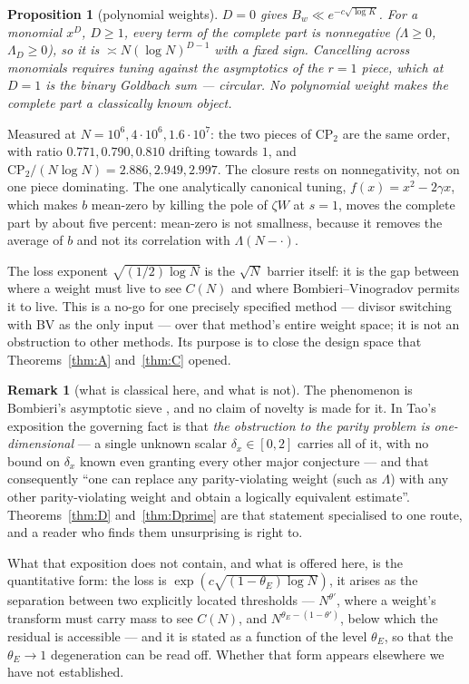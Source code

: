 \documentclass[11pt,a4paper]{article}
\theoremstyle{plain}
\newtheorem{proposition}[theorem]{Proposition}
\theoremstyle{definition}
\newtheorem{remark}[theorem]{Remark}
\begin{document}
\begin{proposition}[polynomial weights]\label{prop:Dpp}
$D=0$ gives $B_w\ll e^{-c\sqrt{\log K}}$. For a monomial $x^D$,
$D\ge1$, every term of the complete part is nonnegative
($\Lambda\ge0$, $\Lambda_D\ge0$), so it is $\asymp N(\log N)^{D-1}$
with a fixed sign. Cancelling across monomials requires tuning against
the asymptotics of the $r=1$ piece, which at $D=1$ is the binary
Goldbach sum --- circular. No polynomial weight makes the complete
part a classically known object.
\end{proposition}

Measured at $N=10^6,4\cdot10^6,1.6\cdot10^7$: the two pieces of
$\mathrm{CP}_2$ are the same order, with ratio $0.771,0.790,0.810$
drifting towards $1$, and $\mathrm{CP}_2/(N\log N) = 2.886, 2.949,
2.997$. The closure rests on nonnegativity, not on one piece
dominating. The one analytically canonical tuning,
$f(x)=x^2-2\gamma x$, which makes $b$ mean-zero by killing the pole of
$\zeta W$ at $s=1$, moves the complete part by about five percent:
mean-zero is not smallness, because it removes the average of $b$ and
not its correlation with $\Lambda(N-\cdot)$.

The loss exponent $\sqrt{(1/2)\log N}$ is the $\sqrt N$ barrier itself:
it is the gap between where a weight must live to see $C(N)$ and where
Bombieri--Vinogradov permits it to live. This is a no-go for one
precisely specified method --- divisor switching with BV as the only
input --- over that method's entire weight space; it is not an
obstruction to other methods. Its purpose is to close the design space
that Theorems~\ref{thm:A} and~\ref{thm:C} opened.

\begin{remark}[what is classical here, and what is not]
\label{rem:bombieri}
The phenomenon is Bombieri's asymptotic sieve \cite{Bom76}, and no
claim of novelty is made for it. In Tao's exposition \cite{TaoBAS} the
governing fact is that \emph{the obstruction to the parity problem is
one-dimensional} --- a single unknown scalar $\delta_x\in[0,2]$ carries
all of it, with no bound on $\delta_x$ known even granting every other
major conjecture --- and that consequently ``one can replace any
parity-violating weight (such as $\Lambda$) with any other
parity-violating weight and obtain a logically equivalent estimate''.
Theorems~\ref{thm:D} and~\ref{thm:Dprime} are that statement
specialised to one route, and a reader who finds them unsurprising is
right to.

What that exposition does not contain, and what is offered here, is
the quantitative form: the loss is
$\exp(c\sqrt{(1-\theta_E)\log N})$, it arises as the separation
between two explicitly located thresholds --- $N^{\theta'}$, where a
weight's transform must carry mass to see $C(N)$, and
$N^{\theta_E-(1-\theta')}$, below which the residual is accessible ---
and it is stated as a function of the level $\theta_E$, so that the
$\theta_E\to1$ degeneration can be read off. Whether that form appears
elsewhere we have not established.
\end{remark}
\end{document}

